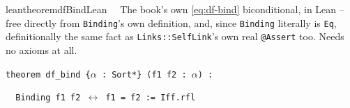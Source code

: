 \begin{restatable}{leantheorem}{dfBindLean}~~ The book's own \ref{eq:df-bind}
biconditional, in Lean -- free directly from \texttt{Binding}'s own definition, and, since
\texttt{Binding} literally is \texttt{Eq}, definitionally the same fact as \texttt{Links::SelfLink}'s
own real \texttt{@Assert} too. Needs no axioms at all.

\texttt{\textcolor{leancolor}{theorem} \textcolor{leanyellow}{df\_bind} \{$\alpha$ : Sort*\} (f1 f2 : $\alpha$) :}

\texttt{~~Binding f1 f2 $\leftrightarrow$ f1 = f2 := Iff.rfl}
\label{df_bind}
\end{restatable}

